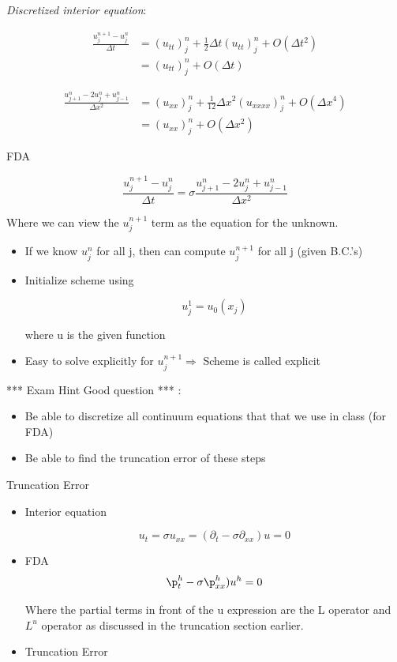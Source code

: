 \textit{Discretized interior equation}:

\begin{align}
    \frac{u_j^{n+1}-u_j^n}{\Delta t} &= (u_{tt})_j^n + \frac{1}{2} \Delta t (u_{tt})_j^n + O (\Delta t^2) \\
    &= (u_{tt})_j^n + O (\Delta t)
\end{align}

\begin{align}
    \frac{u_{j+1}^n - 2 u_j^n + u_{j-1}^n}{\Delta x^2} &= (u_{xx})^n_j + \frac{1}{12} \Delta x^2 (u_{xxxx})_j^n + O(\Delta x^4)\\
    &= (u_{xx})_j^n + O(\Delta x^2)
\end{align}

FDA

\begin{equation}
    \frac{u_j^{n+1}-u_j^n}{\Delta t} = \sigma \frac{u_{j+1}^n - 2 u_j^n + u_{j-1}^n}{\Delta x^2}
\end{equation}

Where we can view the $u_j^{n+1}$ term as the equation for the unknown.

\begin{itemize}
    \item If we know $u_j^n$ for all j, then can compute $u_j^{n+1}$ for all j (given B.C.'s)
    \item Initialize scheme using

    \[ u_j^1 = u_0(x_j)\]

    where u is the given function

    \item Easy to solve explicitly for $u_j^{n+1} \Rightarrow$ Scheme is called explicit
\end{itemize}

*** Exam Hint Good question *** : 
\begin{itemize}
    \item Be able to discretize all continuum equations that that we use in class (for FDA)
    \item Be able to find the truncation error of these steps
\end{itemize}

Truncation Error
\begin{itemize}
    \item Interior equation

    \[ u_t = \sigma u_{xx} = (\partial_t - \sigma \partial_{xx})u = 0\]

    \item FDA
    \[ \p_t^h -\sigma \p_{xx}^h )u^h = 0 \]

    Where the partial terms in front of the u expression are the L operator and $L^u$ operator as discussed in the truncation section earlier.

    \item Truncation Error

\end{itemize}

